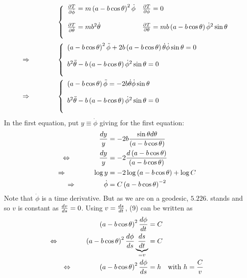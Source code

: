 \begin{align}
&\left\{\begin{array}{ll}
\frac{\partial T}{\partial \dot{\phi}}= m \left(a-b\cos \theta \right)^2   \dot{\phi}&\frac{\partial T}{\partial {\phi}}= 0\\\\
\frac{\partial T}{\partial \dot{\theta}}=  mb^2\dot{\theta}&\frac{\partial T}{\partial {\theta}}=  mb\left(a-b\cos \theta \right)\dot{\phi}^2\sin \theta\\\\
\end{array}\right.\\
\Rightarrow\quad\quad\quad\quad &\left\{\begin{array}{l}
\left(a-b\cos \theta \right)^2   \ddot{\phi}+2b\left(a-b\cos \theta \right)\dot{\theta} \dot{\phi}\sin \theta  =0\\\\
b^2\ddot{\theta}-b\left(a-b\cos \theta \right)\dot{\phi}^2\sin \theta=0\\\\
\end{array}\right.\\
\Rightarrow\quad\quad\quad\quad &\left\{\begin{array}{l}
\left(a-b\cos \theta \right)   \ddot{\phi}=-2b\dot{\theta} \dot{\phi}\sin \theta  \\\\
b^2\ddot{\theta}-b\left(a-b\cos \theta \right)\dot{\phi}^2\sin \theta=0\\\\
\end{array}\right.
\end{align}
In the first equation, put $y \equiv \dot{\phi}$ giving for the first equation:
\begin{align}
\frac{dy}{y}&=-2b \frac{\sin \theta d\theta} {\left(a-b\cos \theta \right)}  \\
\Leftrightarrow\quad\quad\quad\quad\frac{dy}{y}&=-2 \frac{d\left(a-b\cos \theta \right)} {\left(a-b\cos \theta \right)}\\
\Rightarrow \quad\quad\quad\quad \log y&=-2 \log \left(a-b\cos \theta \right)+\log C^{}\\
\Rightarrow \quad\quad\quad\quad \dot{\phi}&= C \left(a-b\cos \theta \right)^{-2}
\end{align}
Note that $\dot{\phi}$ is a time derivative. But as we are on a geodesic, $\mathbf{5.226.}$ stands and so $v$ is constant as $\dv{v}{s} =0$. Using $v = \dv{s}{t}$, (9) can be written as 
\begin{align}
\left(a-b\cos \theta \right)^{2}\dv{\phi}{t}&= C \\
\Leftrightarrow\quad\quad\quad\quad\left(a-b\cos \theta \right)^{2}\dv{\phi}{s}\underbrace{\dv{s}{t}}_{=v}&= C \\
\Leftrightarrow\quad\quad\quad\quad\left(a-b\cos \theta \right)^{2}\dv{\phi}{s}&= h \quad \text{with } h=\frac{C}{v}
\end{align}
